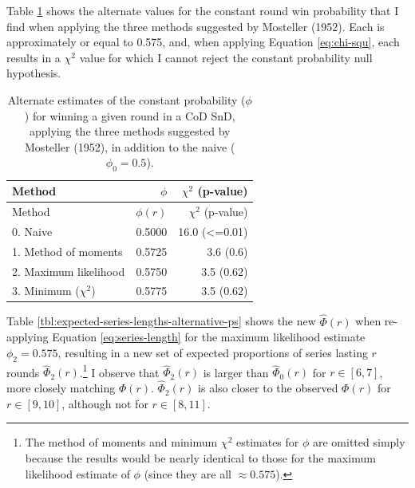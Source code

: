 \documentclass{article}
\begin{document}
Table \ref{tbl:mosteller-methods-results} shows the alternate values for
the constant round win probability that I find when applying the three
methods suggested by Mosteller (1952). Each is approximately or equal to
0.575, and, when applying Equation \ref{eq:chi-squ}, each results in a
\(\chi^2\) value for which I cannot reject the constant probability null
hypothesis.

\begin{longtable}[]{@{}lrr@{}}
\caption{Alternate estimates of the constant probability ($\phi$) for winning a given round in a CoD SnD, applying the three methods suggested by Mosteller (1952), in addition to the naive ($\phi_0 = 0.5$).}\label{tbl:mosteller-methods-results} \\
\toprule()
Method & $\phi$ & $\chi^2$ (p-value) \\
\midrule()
\endfirsthead
\toprule()
Method & $\phi(r)$ & $\chi^2$ (p-value) \\
\midrule()
\endhead
0. Naive & 0.5000 & 16.0 (\textless=0.01) \\
1. Method of moments & 0.5725 & 3.6 (0.6) \\
2. Maximum likelihood & 0.5750 & 3.5 (0.62) \\
3. Minimum ($\chi^2$) & 0.5775 & 3.5 (0.62) \\
\bottomrule()
\end{longtable}

Table \ref{tbl:expected-series-lengths-alternative-ps} shows the new
\(\hat{\Phi}(r)\) when re-applying Equation \ref{eq:series-length} for
the maximum likelihood estimate \(\phi_2 = 0.575\), resulting in a new
set of expected proportions of series lasting \(r\) rounds
\(\hat{\Phi}_2(r)\).\footnote{The method of moments and minimum
  \(\chi^2\) estimates for \(\phi\) are omitted simply because the
  results would be nearly identical to those for the maximum likelihood
  estimate of \(\phi\) (since they are all \(\approx 0.575\)).} I
observe that \(\hat{\Phi}_2(r)\) is larger than \(\hat{\Phi}_0(r)\) for
\(r \in [6, 7]\), more closely matching \(\Phi(r)\). \(\hat{\Phi}_2(r)\)
is also closer to the observed \(\Phi(r)\) for \(r \in [9, 10]\),
although not for \(r \in [8, 11]\).
\end{document}

